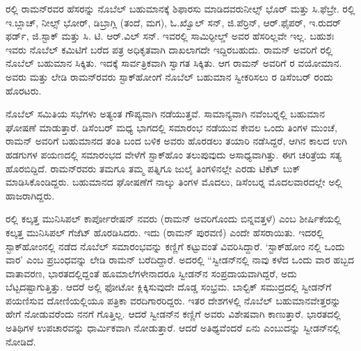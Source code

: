 ರಲ್ಲಿ ರಾಮನ್‍ರವರ ಹೆಸರನ್ನು ನೊಬೆಲ್ ಬಹುಮಾನಕ್ಕೆ ಶಿಫಾರಸು ಮಾಡಿದವರು\break ನೀಲ್ಸ್ ಭೊರ್ ಮತ್ತು ಸಿ.ಫೆಬ್ರೇ. ರಲ್ಲಿ ಇ.ಬ್ಲಾಚ್, ನೀಲ್ಸ್ ಭೋರ್, ಡಿಬ್ರಾಗ್ಲಿ (ತಂದೆ, ಮಗ), ಓ.ಖ್ವೊಲ್ ಸನ್, ಜಿ.ಪೆರ್ರಿನ್, ಆರ್.ಫೈಪರ್, ಇ.ರುದರ್ ಫರ್ಡ್, ಜಿ.ಸ್ಟಾಕ್ ಮತ್ತು ಸಿ. ಟಿ. ಆರ್.ವಿಲ್ ಸನ್. ಇವರಲ್ಲಿ ಸಾಮಿರ್‍ಫೀಲ್ಡ್ ಅವರ ಹೆಸರಿಲ್ಲವೇ ಇಲ್ಲ. ಬಹುಶಃ ಇವರು ನೊಬೆಲ್ ಕಮಿಟಿಗೆ ಬರೆದ ಪತ್ರ ಅಧಿಕೃತವಾಗಿ ದಾಖಲಾಗದೇ ಇದ್ದಿರಬಹುದು. ರಾಮನ್ ಅವರಿಗೆ ರಲ್ಲಿ ನೊಬೆಲ್ ಬಹುಮಾನ ಸಿಕ್ಕಿತು. ಇದಕ್ಕೆ ಸಾರ್ವತ್ರಿಕವಾಗಿ ಸ್ವಾಗತ ಸಿಕ್ಕಿತು. ಆಗ ರಾಮನ್ ಅವರಿಗೆ  ರ ವಯೋಮಾನ. ಅವರು ಮತ್ತು ಲೇಡಿ ರಾಮನ್‍ರವರು ಸ್ಟಾಕ್‍ಹೋಂಗೆ ನೊಬೆಲ್ ಬಹುಮಾನ ಸ್ವೀಕರಿಸಲು ರ ಡಿಸೆಂಬರ್  ರಂದು ಹೊರಟರು.

ನೊಬೆಲ್ ಸಮಿತಿಯ ಸಭೆಗಳು ಅತ್ಯಂತ ಗೌಪ್ಯವಾಗಿ ನಡೆಯುತ್ತವೆ. ಸಾಮಾನ್ಯವಾಗಿ ನವೆಂಬರ್‍ನಲ್ಲಿ ಬಹುಮಾನ ಘೋಷಣೆ ಮಾಡುತ್ತಾರೆ. ಡಿಸೆಂಬರ್ ಮಧ್ಯ ಭಾಗದಲ್ಲಿ ಸಮಾರಂಭ ನಡೆಯುವ ಕೇವಲ ಒಂದು ತಿಂಗಳ ಮುಂಚೆ, ರಾಮನ್ ಅವರಿಗೆ ಬಹುಮಾನದ ತಂತಿ ಬಂದ ಬಳಿಕ ಅವರು ಹೊರಡಲು ತಯಾರಿ ನಡೆಸಿದ್ದರೆ, ಆಗಿನ ಕಾಲದ ಉಗಿ ಹಡಗುಗಳ ಪಯಣದಲ್ಲಿ ಸಮಾರಂಭದ ವೇಳೆಗೆ ಸ್ಟಾಕ್‍ಹೊಂ ತಲುಪುವುದು ಅಸಾಧ್ಯವಾಗಿತ್ತು. ಈಗ ಚರಿತ್ರೆಯ ಸತ್ಯ ಹೊರಬಿದ್ದಿದೆ. ರಾಮನ್‍ರವರು ತಮಗೂ ತಮ್ಮ ಪತ್ನಿಗೂ ಜುಲೈ ತಿಂಗಳಿನಲ್ಲೇ ಎರಡು ಟಿಕೆಟ್ ಬುಕ್ ಮಾಡಿಸಿಕೊಂಡಿದ್ದರು. ಬಹುಮಾನದ ಘೋಷಣೆಗೆ ನಾಲ್ಕು ತಿಂಗಳ ಮೊದಲು, ಡಿಸೆಂಬರ್‍ನ ಮೊದಲವಾರದಲ್ಲೇ ಅಲ್ಲಿ ಹಾಜರಾಗಿದ್ದರು.



ರಲ್ಲಿ ಕಲ್ಕತ್ತ ಮುನಿಸಿಪಲ್ ಕಾರ್ಪೋರೇಷನ್ ನವರು \textit{} (ರಾಮನ್ ಅವರಿಗೊಂದು ಬಿನ್ನವತ್ತಳೆ) ಎಂಬ ಶೀರ್ಷಿಕೆಯಲ್ಲಿ ಕಲ್ಕತ್ತ ಮುನಿಸಿಪಲ್ ಗೆಜೆಟ್ ಹೊರಡಿಸಿದರು. ಇದು  (ರಾಮನ್ ಪುರವಣಿ) ಎಂದೇ ಹೆಸರಾಯಿತು. ಇದರಲ್ಲಿ ಸ್ಟಾಕ್‍ಹೋಂನಲ್ಲಿ ನಡೆದ ನೊಬೆಲ್ ಸಮಾರಂಭವನ್ನು ಕಣ್ಣಿಗೆ ಕಟ್ಟುವಂತೆ ವಿವರಿಸಿದ್ದಾರೆ. ‘ಸ್ಟಾಕ್‍ಹೋಂ ನಲ್ಲಿ ಒಂದು ವಾರ’ ಎಂಬ ಪ್ರಬಂಧವನ್ನು ಲೇಡಿ ರಾಮನ್ ಬರೆದಿದ್ದಾರೆ. ಅದರಲ್ಲಿ\enginline{-} “ಸ್ವೀಡನ್‍ನಲ್ಲಿ ನಾವು ಕಳೆದ ಒಂದು ವಾರ ಹಬ್ಬದ ವಾತಾವರಣ, ಭಾರತದಲ್ಲಿದ್ದಂತೆ ಹೂಮಾಲೆಗಳೇನಾದರೂ ಸ್ವೀಡನ್‍ನ ಸಂಪ್ರದಾಯವಾಗಿದ್ದರೆ, ಅದು ಬೆಟ್ಟದಷ್ಟಾಗುತ್ತಿತ್ತು. ಆದರೆ ಅಲ್ಲಿ ಫೋಟೋ ಕ್ಲಿಕ್ಕಿಸುವುದೇ ದೊಡ್ಡ ಸಂಭ್ರಮ. ಬಾಲ್ಟಿಕ್ ಸಮುದ್ರದಲ್ಲಿ ಸ್ವೀಡನ್‍ಗೆ ಪಯಣಿಸುವ ದೋಣಿಯಲ್ಲಿಯೂ ಪತ್ರಿಕಾ ವರದಿಗಾರರಿದ್ದರು. ಇತರ ದೇಶಗಳಲ್ಲಿ ನೊಬೆಲ್ ಬಹುಮಾನವೇತ್ತರನ್ನು ಹೇಗೆ ನೋಡುವರೆಂದು ನನಗೆ ಗೊತ್ತಿಲ್ಲ. ಆದರೆ ಸ್ವೀಡನ್‍ನ ಕಣ್ಣಿಗೆ ಅವರು ವಿಶೇಷವಾಗಿ ಕಾಣುತ್ತಾರೆ. ಭಾರತದಲ್ಲಿ ಅತಿಥಿಗಳ ಉಪಚಾರವನ್ನು ಧಾರ್ಮಿಕವಾಗಿ ನೋಡುತ್ತಾರೆ. ಆದರೆ ಅತಿಥ್ಯವೆಂದರೆ ಏನು ಎಂಬುದನ್ನು ಸ್ವೀಡನ್‍ನಲ್ಲಿ ನೋಡಿದೆ.

\newpage

